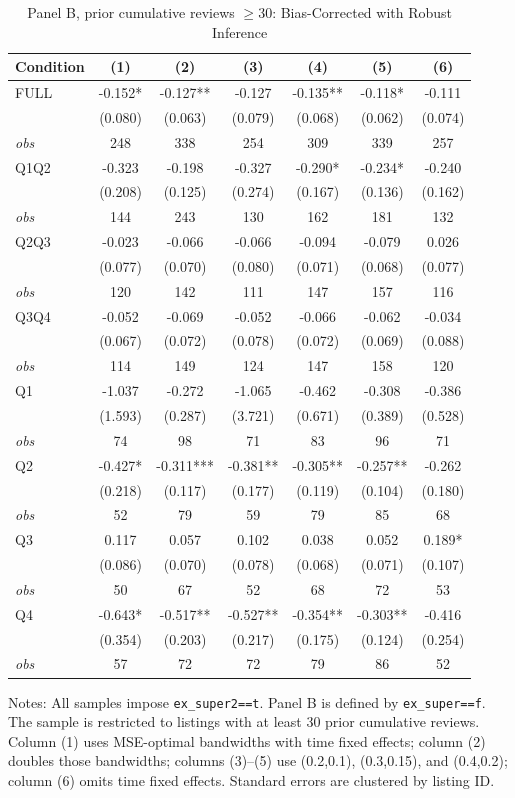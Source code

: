 \begin{table}[!htbp]
\centering
\caption{Panel B, prior cumulative reviews $\geq30$: Bias-Corrected with Robust Inference}
\begin{tabular}{lcccccc}
\toprule
Condition & (1) & (2) & (3) & (4) & (5) & (6) \\
\midrule
FULL & -0.152* & -0.127** & -0.127 & -0.135** & -0.118* & -0.111 \\
 & (0.080) & (0.063) & (0.079) & (0.068) & (0.062) & (0.074) \\
\textit{obs} & 248 & 338 & 254 & 309 & 339 & 257 \\
Q1Q2 & -0.323 & -0.198 & -0.327 & -0.290* & -0.234* & -0.240 \\
 & (0.208) & (0.125) & (0.274) & (0.167) & (0.136) & (0.162) \\
\textit{obs} & 144 & 243 & 130 & 162 & 181 & 132 \\
Q2Q3 & -0.023 & -0.066 & -0.066 & -0.094 & -0.079 & 0.026 \\
 & (0.077) & (0.070) & (0.080) & (0.071) & (0.068) & (0.077) \\
\textit{obs} & 120 & 142 & 111 & 147 & 157 & 116 \\
Q3Q4 & -0.052 & -0.069 & -0.052 & -0.066 & -0.062 & -0.034 \\
 & (0.067) & (0.072) & (0.078) & (0.072) & (0.069) & (0.088) \\
\textit{obs} & 114 & 149 & 124 & 147 & 158 & 120 \\
Q1 & -1.037 & -0.272 & -1.065 & -0.462 & -0.308 & -0.386 \\
 & (1.593) & (0.287) & (3.721) & (0.671) & (0.389) & (0.528) \\
\textit{obs} & 74 & 98 & 71 & 83 & 96 & 71 \\
Q2 & -0.427* & -0.311*** & -0.381** & -0.305** & -0.257** & -0.262 \\
 & (0.218) & (0.117) & (0.177) & (0.119) & (0.104) & (0.180) \\
\textit{obs} & 52 & 79 & 59 & 79 & 85 & 68 \\
Q3 & 0.117 & 0.057 & 0.102 & 0.038 & 0.052 & 0.189* \\
 & (0.086) & (0.070) & (0.078) & (0.068) & (0.071) & (0.107) \\
\textit{obs} & 50 & 67 & 52 & 68 & 72 & 53 \\
Q4 & -0.643* & -0.517** & -0.527** & -0.354** & -0.303** & -0.416 \\
 & (0.354) & (0.203) & (0.217) & (0.175) & (0.124) & (0.254) \\
\textit{obs} & 57 & 72 & 72 & 79 & 86 & 52 \\
\bottomrule
\end{tabular}
\begin{minipage}{0.98\textwidth}\footnotesize
Notes: All samples impose \texttt{ex\_super2==t}. Panel B is defined by \texttt{ex\_super==f}. The sample is restricted to listings with at least 30 prior cumulative reviews. Column (1) uses MSE-optimal bandwidths with time fixed effects; column (2) doubles those bandwidths; columns (3)--(5) use (0.2,0.1), (0.3,0.15), and (0.4,0.2); column (6) omits time fixed effects. Standard errors are clustered by listing ID.
\end{minipage}
\end{table}
